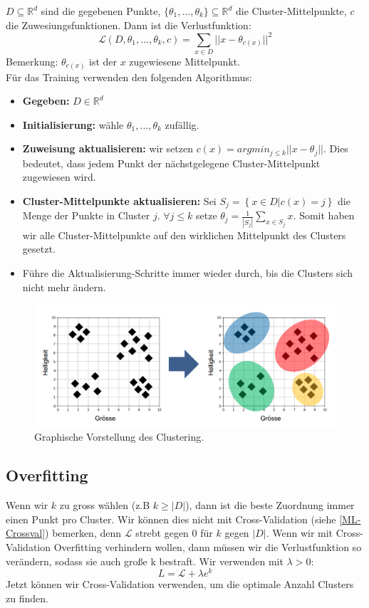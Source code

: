 $D \subseteq \mathbb{R}^d$ sind die gegebenen Punkte,  $\{\theta_1,...,\theta_k\} \subseteq \mathbb{R}^d$ die Cluster-Mittelpunkte, $c$ die Zuwesiungsfunktionen. Dann ist die Verlustfunktion: 
\begin{equation}
    \mathcal{L}(D,\theta_1,...,\theta_k,c) = \sum_{x \in D} || x - \theta_{c(x)}||^2 
\end{equation}
Bemerkung: $\theta_{c(x)}$ ist der  $x$ zugewiesene Mittelpunkt.\\

Für das Training verwenden den folgenden Algorithmus:

\begin{itemize}
    \item \textbf{Gegeben: } $D \in \mathbb{R}^d$
    \item \textbf{Initialisierung: } wähle $\theta_1,...,\theta_k$ zufällig. 
    \item \textbf{Zuweisung aktualisieren: } wir setzen $c(x) = argmin_{j \leq k} || x -\theta_j||$. Dies bedeutet, dass jedem Punkt der nächstgelegene Cluster-Mittelpunkt zugewiesen wird.
    \item \textbf{Cluster-Mittelpunkte aktualisieren: } Sei $S_j = \left\{ x \in D | c(x) = j\right\}$ die Menge der Punkte in Cluster $j$. $\forall j \leq k$ setze $\theta_j = \frac{1}{|S_j|} \sum_{x \in S_j} x$. Somit haben wir alle Cluster-Mittelpunkte auf den wirklichen Mittelpunkt des Clusters gesetzt.
    \item Führe die Aktualisierung-Schritte immer wieder durch, bis die Clusters sich nicht mehr ändern. 
\end{itemize}
\begin{figure}
    \centering
    \includegraphics[scale=0.3]{Figures/ML-Clustering.png}
    \caption{Graphische Vorstellung des Clustering.}
\end{figure}
\subsection{Overfitting}
Wenn wir $k$ zu gross wählen (z.B  $k \geq |D|$), dann ist die beste Zuordnung immer einen Punkt pro Cluster. Wir können dies  nicht mit Cross-Validation (siehe \ref{ML-Crossval}) bemerken, denn $\mathcal{L}$ strebt gegen 0 für $k$ gegen $|D|$. Wenn wir mit Cross-Validation Overfitting verhindern wollen, dann müssen wir die Verlustfunktion so verändern, sodass sie auch große k bestraft. Wir verwenden mit $\lambda > 0$:
\begin{equation}
    L = \mathcal{L} + \lambda e^k
\end{equation}
Jetzt können wir Cross-Validation verwenden, um die optimale Anzahl Clusters zu finden. 


